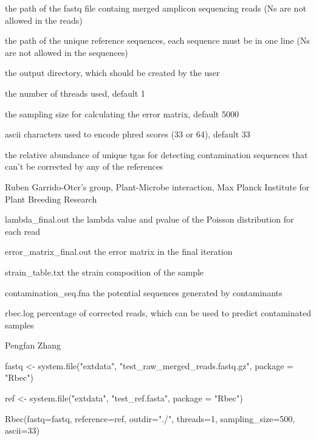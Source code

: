 \documentclass[a4paper]{book}
\begin{document}
\begin{Arguments}
\begin{ldescription}
\item[\code{fastq}] the path of the fastq file containg merged amplicon sequencing reads (Ns are not allowed in the reads)

\item[\code{reference}] the path of the unique reference sequences, each sequence must be in one line (Ns are not allowed in the sequences)

\item[\code{outdir}] the output directory, which should be created by the user

\item[\code{threads}] the number of threads used, default 1

\item[\code{sampling\_size}] the sampling size for calculating the error matrix, default 5000

\item[\code{ascii}] ascii characters used to encode phred scores (33 or 64), default 33

\item[\code{min\_cont\_abs}] the relative abundance of unique tgas for detecting contamination sequences that can't be corrected by any of the references
\end{ldescription}
\end{Arguments}
%
\begin{Details}\relax
Ruben Garrido-Oter's group, Plant-Microbe interaction, Max Planck Institute for Plant Breeding Research
\end{Details}
%
\begin{Value}
lambda\_final.out the lambda value and pvalue of the Poisson distribution for each read

error\_matrix\_final.out the error matrix in the final iteration

strain\_table.txt the strain composition of the sample

contamination\_seq.fna the potential sequences generated by contaminants

rbec.log percentage of corrected reads, which can be used to predict contaminated samples
\end{Value}
%
\begin{Author}\relax
Pengfan Zhang
\end{Author}
%
\begin{Examples}
\begin{ExampleCode}
fastq <- system.file("extdata", "test_raw_merged_reads.fastq.gz", package = "Rbec")

ref <- system.file("extdata", "test_ref.fasta", package = "Rbec")

Rbec(fastq=fastq, reference=ref, outdir="./", threads=1, sampling_size=500, ascii=33)

\end{ExampleCode}
\end{Examples}
\end{document}

